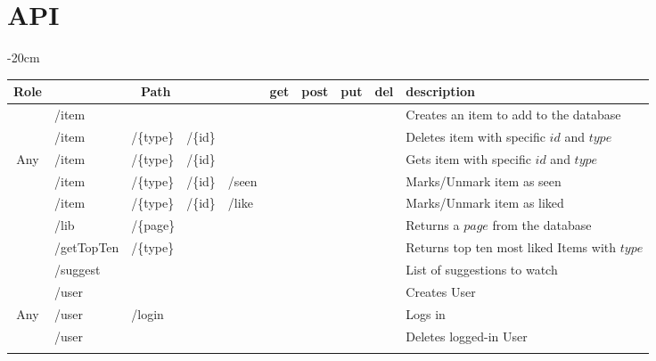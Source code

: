 \documentclass[oneside]{article}
\newcommand{\xmark}{\ding{53}} %
\begin{document}
\section{API}
\label{sec:api}
\begin{table}[H]
  \centering
  \addtolength{\leftskip} {-20cm}
  \addtolength{\rightskip}{-20cm}
  \begin{adjustbox}{width=1.4\textwidth}
  \begin{tabular}{ c|l l l l|c|c|c|c|l }
    \rowcolor{Gray}
    Role & \multicolumn{4}{c|}{Path} & get & post & put & del & description 
    \\ \hline
    
    & /item & & & &
    & \xmark & & &
    Creates an item to add to the database
    \\ \rowcolor{Gray}
    \multirow{-2}{*}{Admin} &
    /item & /\{type\} & /\{id\} & &
     & & & \xmark &
    Deletes item with specific $id$ and $type$ 
    \\ \hhline{-|----|-|-|-|-|~}
    Any &
    /item & /\{type\} & /\{id\} & &
    \xmark & & & &
    Gets item with specific $id$ and $type$ 
    \\ \hhline{-|----|-|-|-|-|~} \rowcolor{Gray}
    & /item & /\{type\} & /\{id\} & /seen &
    & & \xmark & \xmark &
    Marks/Unmark item as seen
    \\ \rowcolor{Gray}
    \multirow{-2}{*}{User}
    & /item & /\{type\} & /\{id\} & /like &
    & & \xmark & \xmark &
    Marks/Unmark item as liked
    \\ \hhline{-|----|-|-|-|-|~}
    & /lib & \multicolumn{3}{l|}{/\{page\}} &
    \xmark & & & &
    Returns a $page$ from the database
    \\
    & /getTopTen & /\{type\} &  &  &
    \xmark & & & &
    Returns top ten most liked Items with $type$
    \\ 
    & \multicolumn{4}{l|}{/suggest} &
     & \xmark & & &
    List of suggestions to watch \\
    & \multicolumn{4}{l|}{/user} &
    & \xmark & & &
    Creates User
    \\
    \multirow{-5}{*}{Any} 
    & /user & \multicolumn{3}{l|}{/login} &
    \xmark & & & &
    Logs in
    \\ \hhline{-|----|-|-|-|-|~} \rowcolor{Gray}
    & \multicolumn{4}{l|}{/user} &
     & & & \xmark &
    Deletes logged-in User
    \\ \rowcolor{Gray}
    \multirow{-2}{*}{User} 

\end{tabular}
\end{adjustbox}
\end{table}
\end{document}
